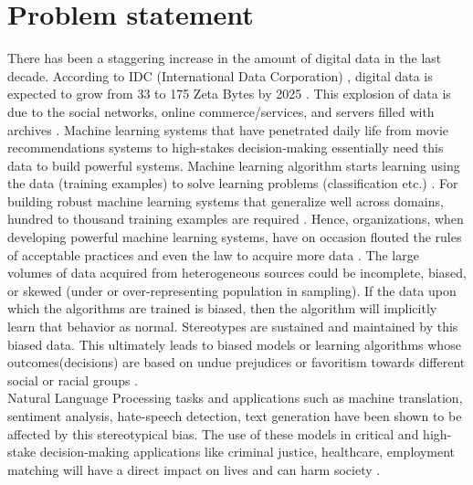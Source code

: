 \section{Problem statement}
There has been a staggering increase in the amount of digital data in the last decade. According to IDC (International Data Corporation) \cite{francos2017computational}, digital data is expected to grow from 33 to 175 Zeta Bytes by 2025 \cite{IDC}. This explosion of data is due to the social networks, online commerce/services, and servers filled with archives \cite{IDC}. Machine learning systems that have penetrated daily life from movie recommendations systems to high-stakes decision-making essentially need this data to build powerful systems. Machine learning algorithm starts learning using the data (training examples) to solve learning problems (classification etc.) \cite{jordan2015machine}. For building robust machine learning systems that generalize well across domains, hundred to thousand training examples are required \cite{radford2019language}. Hence, organizations, when developing powerful machine learning systems, have on occasion flouted the rules of acceptable practices and even the law to acquire more data \cite{lloyd2018bias}. The large volumes of data acquired from heterogeneous sources could be incomplete, biased, or skewed (under or over-representing population in sampling)\cite{campolo2017ai}. If the data upon which the algorithms are trained is biased, then the algorithm will implicitly learn that behavior as normal\cite{lloyd2018bias}. Stereotypes are sustained and maintained by this biased data. This ultimately leads to biased models or learning algorithms whose outcomes(decisions) are based on undue prejudices or favoritism towards different social or racial groups \cite{mehrabi2019survey}. 
\\
Natural Language Processing tasks and applications such as machine translation, sentiment analysis, hate-speech detection, text generation \cite{blodgett2020language} have been shown to be affected by this stereotypical bias. The use of these models in critical and high-stake decision-making applications like criminal justice, healthcare, employment matching will have a direct impact on lives and can harm society \cite{mehrabi2019survey}.
\\

